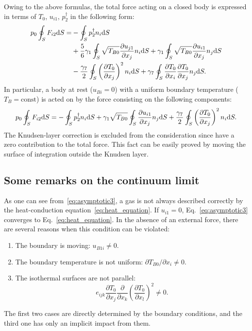 \documentclass[smallextended, final]{svjour3} %
\newcommand{\dd}{\mathrm{d}}
\newcommand{\pder}[2][]{\frac{\partial#1}{\partial#2}}
\newcommand{\Pder}[2][]{\partial#1/\partial#2}
\begin{document}
Owing to the above formulas, the total force acting on a closed body
is expressed in terms of \(T_0\), \(u_{i1}\), \(p^\dag_2\) in the following form:
\begin{align}\label{eq:force:terms_general}
    p_0 \oint_S F_{i2} \dd{S} =
        &- \oint_S p_2^\dag n_i \dd{S} \notag\\
        &+ \frac{5}{6}\gamma_1 \oint_S \sqrt{T_{B0}} \pder[u_{j1}]{x_j} n_i \dd{S}
        + \gamma_1 \oint_S \sqrt{T_{B0}} \pder[u_{i1}]{x_j} n_j \dd{S} \notag\\
        &- \frac{\gamma_7}{2} \oint_S \left(\pder[T_0]{x_j}\right)^2 n_i \dd{S}
        + \gamma_7 \oint_S \pder[T_0]{x_i}\pder[T_0]{x_j} n_j \dd{S}.
\end{align}
In particular, a body at rest (\(u_{Bi} =0 \)) with a uniform boundary temperature (\(T_B = \mathrm{const}\))
is acted on by the force consisting on the following components:
\begin{equation}\label{eq:force:terms}
    p_0 \oint_S F_{i2} \dd{S} =
        - \oint_S p_2^\dag n_i \dd{S} \\
        + \gamma_1 \sqrt{T_{B0}} \oint_S \pder[u_{i1}]{x_j} n_j \dd{S}
        + \frac{\gamma_7}{2} \oint_S \left(\pder[T_0]{x_j}\right)^2 n_i \dd{S}.
\end{equation}
The Knudsen-layer correction is excluded from the consideration since have a zero contribution to the total force.
This fact can be easily proved by moving the surface of integration outside the Knudsen layer.

\subsection{Some remarks on the continuum limit}

As one can see from~\eqref{eq:asymptotic3}, a gas is not always described correctly
by the heat-conduction equation~\eqref{eq:heat_equation}.
If \(u_{i1} = 0\), Eq.~\eqref{eq:asymptotic3} converges to Eq.~\eqref{eq:heat_equation}.
In the absence of an external force, there are several reasons when this condition can be violated:
\begin{enumerate}
    \item The boundary is moving: \(u_{B1i} \neq 0 \).
    \item The boundary temperature is not uniform: \(\Pder[T_{B0}]{x_i} \neq 0 \).
    \item The isothermal surfaces are not parallel:
        \begin{equation}\label{eq:equilibrium}
            e_{ijk}\pder[T_0]{x_j}\pder{x_k}\left(\pder[T_0]{x_l}\right)^2 \neq 0.
        \end{equation}
\end{enumerate}
The first two cases are directly determined by the boundary conditions,
and the third one has only an implicit impact from them.
\end{document}
